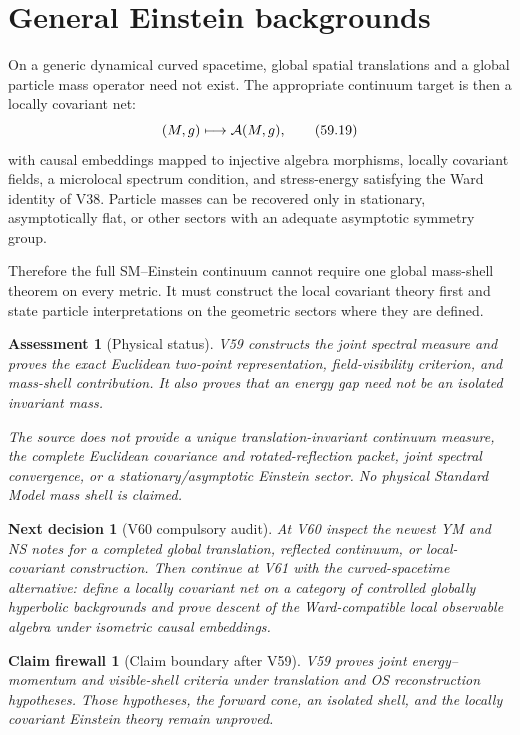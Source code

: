 \documentclass[11pt]{article}
\newtheorem{firewall}[theorem]{Claim firewall}
\newtheorem{decision}[theorem]{Next decision}
\newtheorem{assessment}[theorem]{Assessment}
\theoremstyle{remark}
\begin{document}
\section{General Einstein backgrounds}

On a generic dynamical curved spacetime, global spatial translations
and a global particle mass operator need not exist.  The appropriate
continuum target is then a locally covariant net:
\[
 (M,g)\longmapsto{\cal A}(M,g),                         \tag{59.19}
\]
with causal embeddings mapped to injective algebra morphisms,
locally covariant fields, a microlocal spectrum condition, and
stress-energy satisfying the Ward identity of V38.  Particle masses
can be recovered only in stationary, asymptotically flat, or other
sectors with an adequate asymptotic symmetry group.

Therefore the full SM--Einstein continuum cannot require one global
mass-shell theorem on every metric.  It must construct the local
covariant theory first and state particle interpretations on the
geometric sectors where they are defined.

\begin{assessment}[Physical status]
\label{ass:v15v59-status}
V59 constructs the joint spectral measure and proves the exact
Euclidean two-point representation, field-visibility criterion, and
mass-shell contribution.  It also proves that an energy gap need not
be an isolated invariant mass.

The source does not provide a unique translation-invariant continuum
measure, the complete Euclidean covariance and rotated-reflection
packet, joint spectral convergence, or a stationary/asymptotic
Einstein sector.  No physical Standard Model mass shell is claimed.
\end{assessment}

\begin{decision}[V60 compulsory audit]
\label{dec:v15v59-next}
At V60 inspect the newest YM and NS notes for a completed global
translation, reflected continuum, or local-covariant construction.
Then continue at V61 with the curved-spacetime alternative: define a
locally covariant net on a category of controlled globally
hyperbolic backgrounds and prove descent of the Ward-compatible
local observable algebra under isometric causal embeddings.
\end{decision}

\begin{firewall}[Claim boundary after V59]
\label{fire:v15v59}
V59 proves joint energy--momentum and visible-shell criteria under
translation and OS reconstruction hypotheses.  Those hypotheses,
the forward cone, an isolated shell, and the locally covariant
Einstein theory remain unproved.
\end{firewall}
\end{document}
